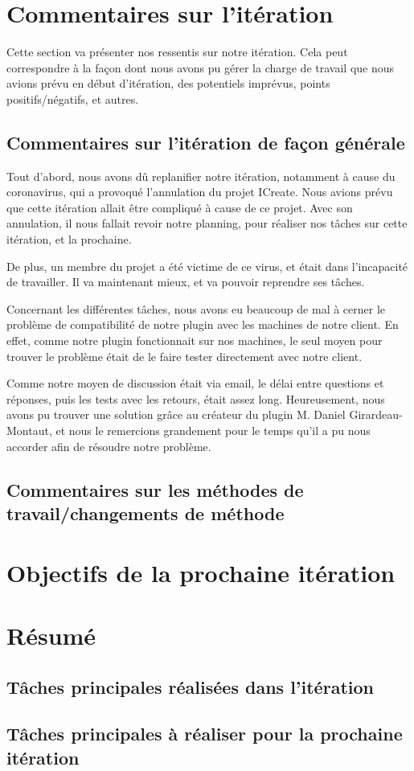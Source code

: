 \documentclass[12pt,titlepage,french]{article}
\begin{document}
\section{Commentaires sur l'itération}

Cette section va présenter nos ressentis sur notre itération. Cela peut correspondre à la façon dont nous avons pu gérer la charge de travail que nous avions prévu en début d'itération, des potentiels imprévus, points positifs/négatifs, et autres.

\subsection{Commentaires sur l'itération de façon générale}

Tout d'abord, nous avons dû replanifier notre itération, notamment à cause du coronavirus, qui a provoqué l'annulation du projet ICreate. Nous avions prévu que cette itération allait être compliqué à cause de ce projet. Avec son annulation, il nous fallait revoir notre planning, pour réaliser nos tâches sur cette itération, et la prochaine. \newline

De plus, un membre du projet a été victime de ce virus, et était dans l'incapacité de travailler. Il va maintenant mieux, et va pouvoir reprendre ses tâches. \newline

Concernant les différentes tâches, nous avons eu beaucoup de mal à cerner le problème de compatibilité de notre plugin avec les machines de notre client. En effet, comme notre plugin fonctionnait sur nos machines, le seul moyen pour trouver le problème était de le faire tester directement avec notre client. \newline

Comme notre moyen de discussion était via email, le délai entre questions et réponses, puis les tests avec les retours, était assez long. Heureusement, nous avons pu trouver une solution grâce au créateur du plugin M. Daniel Girardeau-Montaut, et nous le remercions grandement pour le temps qu'il a pu nous accorder afin de résoudre notre problème.

\subsection{Commentaires sur les méthodes de travail/changements de méthode}


\section{Objectifs de la prochaine itération}


\section{Résumé}
\subsection{Tâches principales réalisées dans l'itération}

\subsection{Tâches principales à réaliser pour la prochaine itération}

\begin{thebibliography}{3}

\end{thebibliography}
\end{document}
